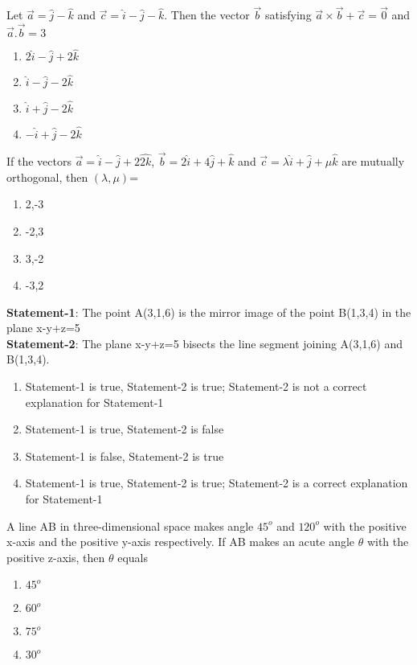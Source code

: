 \item Let $\overrightarrow{a}=\hat{j}-\hat{k}$ and $\overrightarrow{c}=\hat{i}-\hat{j}-\hat{k}$. Then the vector $\overrightarrow{b}$ satisfying $\overrightarrow{a} \times \overrightarrow{b} + \overrightarrow{c}=\overrightarrow{0}$ and $\overrightarrow{a}.\overrightarrow{b}=3$
\begin{enumerate}
\item $2\hat{i}-\hat{j}+2\hat{k}$
\item $\hat{i}-\hat{j}-2\hat{k}$
\item $\hat{i}+\hat{j}-2\hat{k}$
\item $-\hat{i}+\hat{j}-2\hat{k}$
\end{enumerate}

\item If the vectors $\overrightarrow{a}=\hat{i}-\hat{j}+2\hat{2k}$, $\overrightarrow{b}=2\hat{i}+4\hat{j}+\hat{k}$ and $\overrightarrow{c}=\lambda\hat{i}+\hat{j}+\mu\hat{k}$ are mutually orthogonal, then $(\lambda, \mu)$=
\begin{enumerate}
\item 2,-3
\item -2,3
\item 3,-2
\item -3,2
\end{enumerate}

\item \textbf{Statement-1}: The point A(3,1,6) is the mirror image of the point B(1,3,4) in the plane x-y+z=5\\
\textbf{Statement-2}: The plane x-y+z=5 bisects the line segment joining A(3,1,6) and B(1,3,4).
\begin{enumerate}
\item Statement-1 is true, Statement-2 is true; Statement-2 is not a correct explanation for Statement-1
\item Statement-1 is true, Statement-2 is false
\item Statement-1 is false, Statement-2 is true
\item Statement-1 is true, Statement-2 is true; Statement-2 is a correct explanation for Statement-1
\end{enumerate}

\item A line AB in three-dimensional space makes angle $45^{o}$ and $120^{o}$ with the positive x-axis and the positive y-axis respectively. If AB makes an acute angle $\theta$ with the positive z-axis, then $\theta$ equals
\begin{enumerate}
\item $45^{o}$
\item $60^{o}$
\item $75^{o}$
\item $30^{o}$
\end{enumerate}

